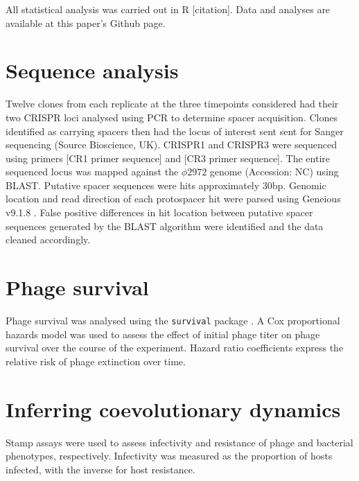 \documentclass [12pt, a4paper, twoside]  {article}
\begin{document}
All statistical analysis was carried out in R [citation]. Data and analyses are available at this paper's Github page.

\section*{Sequence analysis}
Twelve clones from each replicate at the three timepoints considered had their two CRISPR loci analysed using PCR to determine spacer acquisition. Clones identified as carrying spacers then had the locus of interest sent sent for Sanger sequencing (Source Bioscience, UK). CRISPR1 and CRISPR3 were sequenced using primers [CR1 primer sequence] and [CR3 primer sequence]. The entire sequenced locus was mapped against the $\phi 2972$ genome (Accession: NC) using BLAST. Putative spacer sequences were hits approximately 30bp. Genomic location and read direction of each protospacer hit were parsed using Geneious v9.1.8 \citep{kearse2012geneious}. False positive differences in hit location between putative spacer sequences generated by the BLAST algorithm were identified and the data cleaned accordingly. 

\section*{Phage survival}
Phage survival was analysed using the \texttt{survival} package \citep{survival}. A Cox proportional hazards model was used to assess the effect of initial phage titer on phage survival over the course of the experiment. Hazard ratio coefficients express the relative risk of phage extinction over time. 

\section*{Inferring coevolutionary dynamics}
Stamp assays were used to assess infectivity and resistance of phage and bacterial phenotypes, respectively. Infectivity was measured as the proportion of hosts infected, with the inverse for host resistance. 


\clearpage

\end{document}
